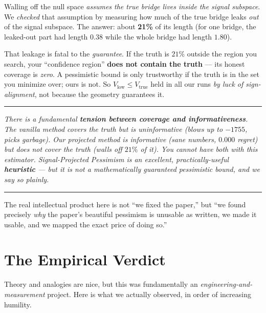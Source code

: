 \documentclass[11pt]{article}
\newenvironment{takeaway}
  {\par\vspace{4pt}\noindent\begin{center}\begin{minipage}{0.94\linewidth}%
   \color{black!88}\rule{\linewidth}{0.7pt}\par\vspace{3pt}\small\itshape}
  {\par\vspace{3pt}\rule{\linewidth}{0.7pt}\end{minipage}\end{center}\vspace{4pt}}
\begin{document}
Walling off the null space \emph{assumes the true bridge lives inside the signal
subspace}. We \emph{checked} that assumption by measuring how much of the true bridge
leaks \emph{out} of the signal subspace. The answer: about \textbf{21\%} of its length
(for one bridge, the leaked-out part had length $0.38$ while the whole bridge had
length $1.80$).

That leakage is fatal to the \emph{guarantee}. If the truth is $21\%$ outside the
region you search, your ``confidence region'' \textbf{does not contain the truth} ---
its honest coverage is \emph{zero}. A pessimistic bound is only trustworthy if the
truth is in the set you minimize over; ours is not. So $V_{\text{low}}\le
V_{\text{true}}$ held in all our runs \emph{by luck of sign-alignment}, not because
the geometry guarantees it.

\begin{takeaway}
There is a fundamental \textbf{tension between coverage and informativeness}. The
vanilla method \emph{covers} the truth but is \emph{uninformative} (blows up to
$-1755$, picks garbage). Our projected method is \emph{informative} (sane numbers,
$0.000$ regret) but does \emph{not} cover the truth (walls off $21\%$ of it). You
cannot have both with this estimator. Signal-Projected Pessimism is an excellent,
practically-useful \textbf{heuristic} --- but it is \emph{not} a mathematically
guaranteed pessimistic bound, and we say so plainly.
\end{takeaway}

The real intellectual product here is not ``we fixed the paper,'' but ``we found
precisely \emph{why} the paper's beautiful pessimism is unusable as written, we made
it usable, and we mapped the exact price of doing so.''

\section{The Empirical Verdict}

Theory and analogies are nice, but this was fundamentally an
\emph{engineering-and-measurement} project. Here is what we actually observed, in
order of increasing humility.
\end{document}
